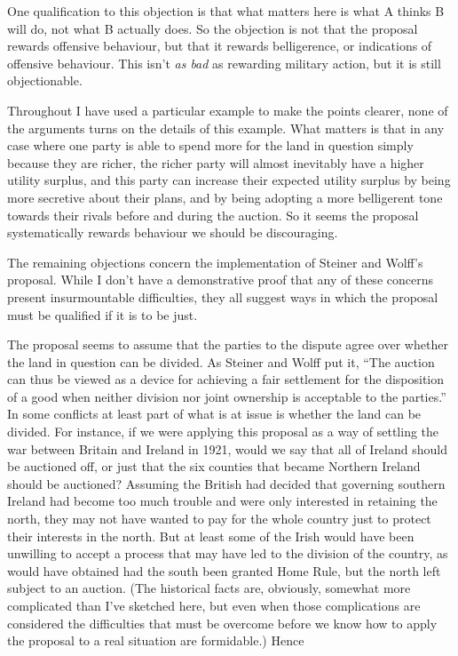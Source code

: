 \documentclass[
  11pt,
  letterpaper,
  DIV=11,
  numbers=noendperiod,
  twoside]{scrartcl}
\begin{document}
One qualification to this objection is that what matters here is what A
thinks B will do, not what B actually does. So the objection is not that
the proposal rewards offensive behaviour, but that it rewards
belligerence, or indications of offensive behaviour. This isn't \emph{as
bad} as rewarding military action, but it is still objectionable.

Throughout I have used a particular example to make the points clearer,
none of the arguments turns on the details of this example. What matters
is that in any case where one party is able to spend more for the land
in question simply because they are richer, the richer party will almost
inevitably have a higher utility surplus, and this party can increase
their expected utility surplus by being more secretive about their
plans, and by being adopting a more belligerent tone towards their
rivals before and during the auction. So it seems the proposal
systematically rewards behaviour we should be discouraging.

The remaining objections concern the implementation of Steiner and
Wolff's proposal. While I don't have a demonstrative proof that any of
these concerns present insurmountable difficulties, they all suggest
ways in which the proposal must be qualified if it is to be just.

The proposal seems to assume that the parties to the dispute agree over
whether the land in question can be divided. As Steiner and Wolff put
it, ``The auction can thus be viewed as a device for achieving a fair
settlement for the disposition of a good when neither division nor joint
ownership is acceptable to the parties.'' In some conflicts at least
part of what is at issue is whether the land can be divided. For
instance, if we were applying this proposal as a way of settling the war
between Britain and Ireland in 1921, would we say that all of Ireland
should be auctioned off, or just that the six counties that became
Northern Ireland should be auctioned? Assuming the British had decided
that governing southern Ireland had become too much trouble and were
only interested in retaining the north, they may not have wanted to pay
for the whole country just to protect their interests in the north. But
at least some of the Irish would have been unwilling to accept a process
that may have led to the division of the country, as would have obtained
had the south been granted Home Rule, but the north left subject to an
auction. (The historical facts are, obviously, somewhat more complicated
than I've sketched here, but even when those complications are
considered the difficulties that must be overcome before we know how to
apply the proposal to a real situation are formidable.) Hence
\end{document}
